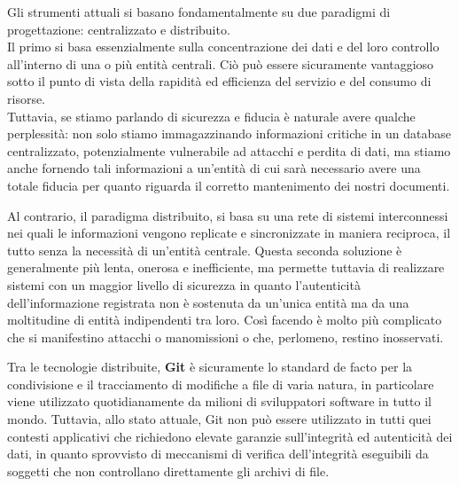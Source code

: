 Gli strumenti attuali si basano fondamentalmente su due paradigmi
di progettazione: centralizzato e distribuito.
\\
Il primo si basa essenzialmente sulla concentrazione dei dati e del loro controllo
all'interno di una o più entità centrali. Ciò può essere sicuramente vantaggioso sotto
il punto di vista della rapidità ed efficienza del servizio e del consumo di risorse.
\\
Tuttavia, se stiamo parlando di sicurezza e fiducia è naturale avere qualche perplessità:
non solo stiamo immagazzinando informazioni critiche in un database centralizzato,
potenzialmente vulnerabile ad attacchi e perdita di dati, ma stiamo anche fornendo
tali informazioni a un'entità di cui sarà necessario avere una totale fiducia per quanto
riguarda il corretto mantenimento dei nostri documenti.

Al contrario, il paradigma distribuito, si basa su una rete di sistemi interconnessi nei
quali le informazioni vengono replicate e sincronizzate in maniera reciproca, il tutto senza
la necessità di un'entità centrale. 
Questa seconda soluzione è generalmente più lenta, onerosa e inefficiente,
ma permette tuttavia di realizzare sistemi con un maggior livello di sicurezza in quanto
l'autenticità dell'informazione registrata non è sostenuta da un'unica entità ma da una
moltitudine di entità indipendenti tra loro.
Così facendo è molto più complicato che si manifestino attacchi o manomissioni
o che, perlomeno, restino inosservati.

Tra le tecnologie distribuite, \textbf{Git} è sicuramente lo standard de facto per la condivisione
e il tracciamento di modifiche a file di varia natura, in particolare viene utilizzato
quotidianamente da milioni di sviluppatori software in tutto il mondo.
Tuttavia, allo stato attuale, Git non può essere utilizzato in tutti quei
contesti applicativi che richiedono elevate garanzie sull'integrità ed autenticità dei dati,
in quanto sprovvisto di meccanismi di verifica dell'integrità eseguibili da soggetti
che non controllano direttamente gli archivi di file.

